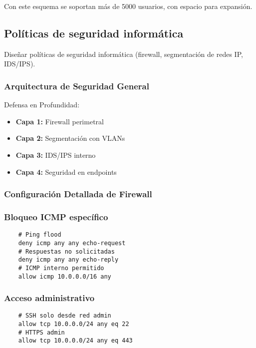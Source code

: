 Con este esquema se soportan más de 5000 usuarios, con espacio para expansión.

\subsection{\textbf{Políticas de seguridad informática}}

Diseñar políticas de seguridad informática (firewall, segmentación de redes IP, IDS/IPS).\\

%

\subsubsection{\textbf{Arquitectura de Seguridad General}}
Defensa en Profundidad:

\begin{itemize}
    \item \textbf{Capa 1:} Firewall perimetral
    \item \textbf{Capa 2:} Segmentación con VLANs
    \item \textbf{Capa 3:} IDS/IPS interno
    \item \textbf{Capa 4:} Seguridad en endpoints
\end{itemize}

\subsubsection{\textbf{Configuración Detallada de Firewall}}

\subsubsection*{Bloqueo ICMP específico}
\begin{verbatim}
    # Ping flood
    deny icmp any any echo-request
    # Respuestas no solicitadas
    deny icmp any any echo-reply
    # ICMP interno permitido
    allow icmp 10.0.0.0/16 any
\end{verbatim}

\subsubsection*{Acceso administrativo}
\begin{verbatim}
    # SSH solo desde red admin
    allow tcp 10.0.0.0/24 any eq 22
    # HTTPS admin
    allow tcp 10.0.0.0/24 any eq 443
\end{verbatim}


